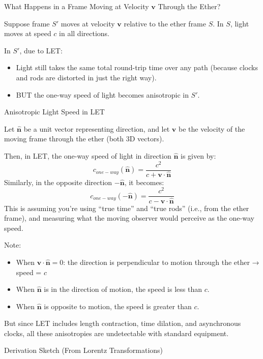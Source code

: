 \documentclass[a4paper]{article}
\theoremstyle{plain}
\theoremstyle{definition}
\newcommand{\vect}[1]{\mathbf{#1}}
\newcommand{\hatvec}[1]{\hat{\mathbf{#1}}}
\begin{document}
What Happens in a Frame Moving at Velocity $\vect{v}$ Through the Ether?

Suppose frame $S'$ moves at velocity $\vect{v}$ relative to the ether
frame $S$.  In $S$, light moves at speed $c$ in all directions.

In $S'$, due to LET:
\begin{itemize}
\item Light still takes the same total round-trip time over any path
  (because clocks and rods are distorted in just the right way).
\item BUT the one-way speed of light becomes anisotropic in $S'$.
\end{itemize}

Anisotropic Light Speed in LET

Let $\hatvec{n}$ be a unit vector representing direction, and let
$\vect{v}$ be the velocity of the moving frame through the ether (both
3D vectors).

Then, in LET, the one-way speed of light in direction $\hatvec{n}$ is
given by:
\begin{equation}
c_{one-way}(\hatvec{n}) = \frac{c^2}{c + \vect{v}\cdot\hatvec{n}}
\end{equation}
Similarly, in the opposite direction $-\hatvec{n}$, it becomes:
\begin{equation}
c_{one-way}(-\hatvec{n}) = \frac{c^2}{c - \vect{v}\cdot\hatvec{n}}
\end{equation}
This is assuming you're using ``true time'' and ``true rods'' (i.e.,
from the ether frame), and measuring what the moving observer would
perceive as the one-way speed.

Note:
\begin{itemize}
\item When $\vect{v} \cdot \hatvec{n} = 0$: the direction is
  perpendicular to motion through the ether → speed = $c$
\item When $\hatvec{n}$ is in the direction of motion, the speed is
  less than $c$.
\item When $\hatvec{n}$ is opposite to motion, the speed is greater
  than $c$.
\end{itemize}
But since LET includes length contraction, time dilation, and
asynchronous clocks, all these anisotropies are undetectable with
standard equipment.

Derivation Sketch (From Lorentz Transformations)
\end{document}
